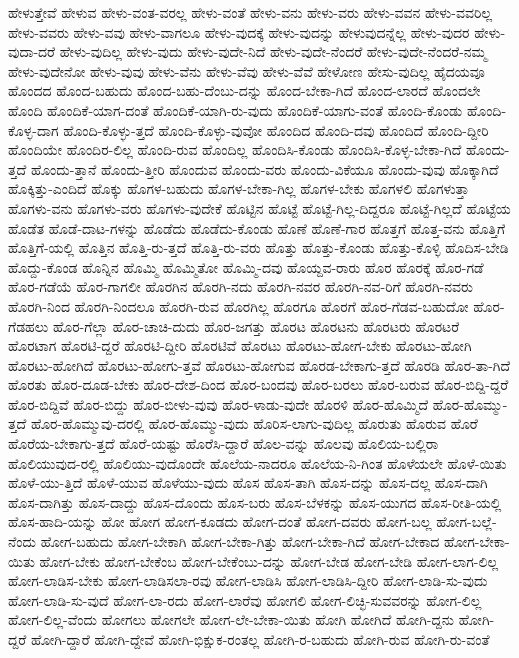 {ಹೇಳುತ್ತೇವೆ
ಹೇಳುವ
ಹೇಳು-ವಂತ-ವರಲ್ಲ
ಹೇಳು-ವಂತೆ
ಹೇಳು-ವನು
ಹೇಳು-ವರು
ಹೇಳು-ವವನ
ಹೇಳು-ವವರಿಲ್ಲ
ಹೇಳು-ವವರು
ಹೇಳು-ವವು
ಹೇಳು-ವಾಗಲೂ
ಹೇಳು-ವುದಕ್ಕೆ
ಹೇಳು-ವುದನ್ನು
ಹೇಳುವುದನ್ನೆಲ್ಲ
ಹೇಳು-ವುದರ
ಹೇಳು-ವುದಾ-ದರೆ
ಹೇಳು-ವುದಿಲ್ಲ
ಹೇಳು-ವುದು
ಹೇಳು-ವುದೇ-ನಿದೆ
ಹೇಳು-ವುದೇ-ನೆಂದರೆ
ಹೇಳು-ವುದೇ-ನೆಂದರೆ-ನಮ್ಮ
ಹೇಳು-ವುದೇನೋ
ಹೇಳು-ವುವು
ಹೇಳು-ವೆನು
ಹೇಳು-ವೆವು
ಹೇಳು-ವೆವೆ
ಹೇಳೋಣ
ಹೇಸು-ವುದಿಲ್ಲ
ಹೈದಯವೂ
ಹೊಂದದ
ಹೊಂದ-ಬಹುದು
ಹೊಂದ-ಬಹು-ದೆಂಬು-ದನ್ನು
ಹೊಂದ-ಬೇಕಾ-ಗಿದೆ
ಹೊಂದ-ಲಾರದೆ
ಹೊಂದಲೇ
ಹೊಂದಿ
ಹೊಂದಿಕೆ-ಯಾಗ-ದಂತೆ
ಹೊಂದಿಕೆ-ಯಾಗಿ-ರು-ವುದು
ಹೊಂದಿಕೆ-ಯಾಗು-ವಂತೆ
ಹೊಂದಿ-ಕೊಂಡು
ಹೊಂದಿ-ಕೊಳ್ಳ-ದಾಗ
ಹೊಂದಿ-ಕೊಳ್ಳು-ತ್ತದೆ
ಹೊಂದಿ-ಕೊಳ್ಳು-ವುವೋ
ಹೊಂದಿದ
ಹೊಂದಿ-ದವು
ಹೊಂದಿದೆ
ಹೊಂದಿ-ದ್ದೀರಿ
ಹೊಂದಿಯೇ
ಹೊಂದಿರ-ಲಿಲ್ಲ
ಹೊಂದಿ-ರುವ
ಹೊಂದಿಲ್ಲ
ಹೊಂದಿಸಿ-ಕೊಂಡು
ಹೊಂದಿಸಿ-ಕೊಳ್ಳ-ಬೇಕಾ-ಗಿದೆ
ಹೊಂದು-ತ್ತದೆ
ಹೊಂದು-ತ್ತಾನೆ
ಹೊಂದು-ತ್ತೀರಿ
ಹೊಂದುವ
ಹೊಂದು-ವರು
ಹೊಂದು-ವಿಕೆಯೂ
ಹೊಂದು-ವುವು
ಹೊಕ್ಕಾಗಿದೆ
ಹೊಕ್ಕಿತ್ತು-ಎಂದಿದೆ
ಹೊಕ್ಕು
ಹೊಗಳ-ಬಹುದು
ಹೊಗಳ-ಬೇಕಾ-ಗಿಲ್ಲ
ಹೊಗಳ-ಬೇಕು
ಹೊಗಳಲಿ
ಹೊಗಳುತ್ತಾ
ಹೊಗಳು-ವನು
ಹೊಗಳು-ವರು
ಹೊಗಳು-ವುದೇಕೆ
ಹೊಟ್ಟಿನ
ಹೊಟ್ಟೆ
ಹೊಟ್ಟೆ-ಗಿಲ್ಲ-ದಿದ್ದರೂ
ಹೊಟ್ಟೆ-ಗಿಲ್ಲದೆ
ಹೊಟ್ಟೆಯ
ಹೊಡೆತ
ಹೊಡೆ-ದಾಟ-ಗಳನ್ನು
ಹೊಡೆದು
ಹೊಡೆದು-ಕೊಂಡು
ಹೊಣೆ
ಹೊಣೆ-ಗಾರ
ಹೊತ್ತಗೆ
ಹೊತ್ತ-ವನು
ಹೊತ್ತಿಗೆ
ಹೊತ್ತಿಗೆ-ಯಲ್ಲಿ
ಹೊತ್ತಿನ
ಹೊತ್ತಿ-ರು-ತ್ತದೆ
ಹೊತ್ತಿ-ರು-ವರು
ಹೊತ್ತು
ಹೊತ್ತು-ಕೊಂಡು
ಹೊತ್ತು-ಕೊಳ್ಳಿ
ಹೊದಿಸ-ಬೇಡಿ
ಹೊದ್ದು-ಕೊಂಡ
ಹೊನ್ನಿನ
ಹೊಮ್ಮಿ
ಹೊಮ್ಮಿತೋ
ಹೊಮ್ಮಿ-ದವು
ಹೊಯ್ದವ-ರಾರು
ಹೊರ
ಹೊರಕ್ಕೆ
ಹೊರ-ಗಡೆ
ಹೊರ-ಗಡೆಯೆ
ಹೊರ-ಗಾಗಲೀ
ಹೊರಗಿನ
ಹೊರಗಿ-ನದು
ಹೊರಗಿ-ನವರ
ಹೊರಗಿ-ನವ-ರಿಗೆ
ಹೊರಗಿ-ನವರು
ಹೊರಗಿ-ನಿಂದ
ಹೊರಗಿ-ನಿಂದಲೂ
ಹೊರಗಿ-ರುವ
ಹೊರಗಿಲ್ಲ
ಹೊರಗೂ
ಹೊರಗೆ
ಹೊರ-ಗೆಡವ-ಬಹುದೋ
ಹೊರ-ಗೆಡಹಲು
ಹೊರ-ಗೆಲ್ಲಾ
ಹೊರ-ಚಾಚಿ-ದುದು
ಹೊರ-ಜಗತ್ತು
ಹೊರಟ
ಹೊರಟನು
ಹೊರಟರು
ಹೊರಟರೆ
ಹೊರಟಾಗ
ಹೊರಟಿ-ದ್ದರೆ
ಹೊರಟಿ-ದ್ದೀರಿ
ಹೊರಟಿವೆ
ಹೊರಟು
ಹೊರಟು-ಹೋಗ-ಬೇಕು
ಹೊರಟು-ಹೋಗಿ
ಹೊರಟು-ಹೋಗಿದೆ
ಹೊರಟು-ಹೋಗು-ತ್ತವೆ
ಹೊರಟು-ಹೋಗುವ
ಹೊರಡ-ಬೇಕಾಗು-ತ್ತದೆ
ಹೊರಡಿ
ಹೊರ-ತಾ-ಗಿದೆ
ಹೊರತು
ಹೊರ-ದೂಡ-ಬೇಕು
ಹೊರ-ದೇಶ-ದಿಂದ
ಹೊರ-ಬಂದವು
ಹೊರ-ಬರಲು
ಹೊರ-ಬರುವ
ಹೊರ-ಬಿದ್ದಿ-ದ್ದರೆ
ಹೊರ-ಬಿದ್ದಿವೆ
ಹೊರ-ಬಿದ್ದು
ಹೊರ-ಬೀಳು-ವುವು
ಹೊರ-ಳಾಡು-ವುದೇ
ಹೊರಳಿ
ಹೊರ-ಹೊಮ್ಮಿದೆ
ಹೊರ-ಹೊಮ್ಮು-ತ್ತದೆ
ಹೊರ-ಹೊಮ್ಮುವು-ದರಲ್ಲಿ
ಹೊರ-ಹೊಮ್ಮು-ವುದು
ಹೊರಿಸ-ಲಾಗು-ವುದಿಲ್ಲ
ಹೊರುತು
ಹೊರುವ
ಹೊರೆ
ಹೊರೆಯ-ಬೇಕಾಗು-ತ್ತದೆ
ಹೊರೆ-ಯಷ್ಟು
ಹೊರೆಸಿ-ದ್ದಾರೆ
ಹೊಲ-ವನ್ನು
ಹೊಲವು
ಹೊಲಿಯ-ಬಲ್ಲಿರಾ
ಹೊಲಿಯುವುದ-ರಲ್ಲಿ
ಹೊಲಿಯು-ವುದೊಂದೇ
ಹೊಲೆಯ-ನಾದರೂ
ಹೊಲೆಯ-ನಿ-ಗಿಂತ
ಹೊಳೆಯಲೇ
ಹೊಳೆ-ಯಿತು
ಹೊಳೆ-ಯು-ತ್ತಿದೆ
ಹೊಳೆ-ಯುವ
ಹೊಳೆಯು-ವುದು
ಹೊಸ
ಹೊಸ-ತಾಗಿ
ಹೊಸ-ದನ್ನು
ಹೊಸ-ದಲ್ಲ
ಹೊಸ-ದಾಗಿ
ಹೊಸ-ದಾಗಿತ್ತು
ಹೊಸ-ದಾದ್ದು
ಹೊಸ-ದೊಂದು
ಹೊಸ-ಬರು
ಹೊಸ-ಬೆಳಕನ್ನು
ಹೊಸ-ಯುಗದ
ಹೊಸ-ರೀತಿ-ಯಲ್ಲಿ
ಹೊಸ-ಹಾದಿ-ಯನ್ನು
ಹೋ
ಹೋಗ
ಹೋಗ-ಕೂಡದು
ಹೋಗ-ದಂತೆ
ಹೋಗ-ದವರು
ಹೋಗ-ಬಲ್ಲ
ಹೋಗ-ಬಲ್ಲೆ-ನೆಂದು
ಹೋಗ-ಬಹುದು
ಹೋಗ-ಬೇಕಾಗಿ
ಹೋಗ-ಬೇಕಾ-ಗಿತ್ತು
ಹೋಗ-ಬೇಕಾ-ಗಿದೆ
ಹೋಗ-ಬೇಕಾದ
ಹೋಗ-ಬೇಕಾ-ಯಿತು
ಹೋಗ-ಬೇಕು
ಹೋಗ-ಬೇಕೆಂಬ
ಹೋಗ-ಬೇಕೆಂಬು-ದನ್ನು
ಹೋಗ-ಬೇಡ
ಹೋಗ-ಬೇಡಿ
ಹೋಗ-ಲಾಗ-ಲಿಲ್ಲ
ಹೋಗ-ಲಾಡಿಸ-ಬೇಕು
ಹೋಗ-ಲಾಡಿಸಲಾ-ರವು
ಹೋಗ-ಲಾಡಿಸಿ
ಹೋಗ-ಲಾಡಿಸಿ-ದ್ದೀರಿ
ಹೋಗ-ಲಾಡಿ-ಸು-ವುದು
ಹೋಗ-ಲಾಡಿ-ಸು-ವುದೆ
ಹೋಗ-ಲಾ-ರದು
ಹೋಗ-ಲಾರೆವು
ಹೋಗಲಿ
ಹೋಗ-ಲಿಚ್ಛಿ-ಸುವವರನ್ನು
ಹೋಗ-ಲಿಲ್ಲ
ಹೋಗ-ಲಿಲ್ಲ-ವೆಂದು
ಹೋಗಲು
ಹೋಗಲೇ
ಹೋಗ-ಲೇ-ಬೇಕಾ-ಯಿತು
ಹೋಗಿ
ಹೋಗಿದೆ
ಹೋಗಿ-ದ್ದನು
ಹೋಗಿ-ದ್ದರೆ
ಹೋಗಿ-ದ್ದಾರೆ
ಹೋಗಿ-ದ್ದೇವೆ
ಹೋಗಿ-ಭಿಕ್ಷುಕ-ರಂತಲ್ಲ
ಹೋಗಿ-ರ-ಬಹುದು
ಹೋಗಿ-ರುವ
ಹೋಗಿ-ರು-ವಂತೆ
}
